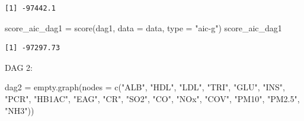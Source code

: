 \documentclass[
  11pt,
  a4paper,
]{article}
\newenvironment{Shaded}{\begin{snugshade}}{\end{snugshade}}
\newcommand{\AttributeTok}[1]{\textcolor[rgb]{0.40,0.45,0.13}{#1}}
\newcommand{\FunctionTok}[1]{\textcolor[rgb]{0.28,0.35,0.67}{#1}}
\newcommand{\NormalTok}[1]{\textcolor[rgb]{0.00,0.23,0.31}{#1}}
\newcommand{\OtherTok}[1]{\textcolor[rgb]{0.00,0.23,0.31}{#1}}
\newcommand{\StringTok}[1]{\textcolor[rgb]{0.13,0.47,0.30}{#1}}
\begin{document}
\begin{verbatim}
[1] -97442.1
\end{verbatim}

\begin{Shaded}
\begin{Highlighting}[numbers=left,,]
\NormalTok{score\_aic\_dag1 }\OtherTok{=} \FunctionTok{score}\NormalTok{(dag1, }\AttributeTok{data =}\NormalTok{ data, }\AttributeTok{type =} \StringTok{"aic{-}g"}\NormalTok{)}
\NormalTok{score\_aic\_dag1}
\end{Highlighting}
\end{Shaded}

\begin{verbatim}
[1] -97297.73
\end{verbatim}

DAG 2:

\begin{Shaded}
\begin{Highlighting}[numbers=left,,]
\NormalTok{dag2 }\OtherTok{=} \FunctionTok{empty.graph}\NormalTok{(}\AttributeTok{nodes =} \FunctionTok{c}\NormalTok{(}\StringTok{"ALB"}\NormalTok{, }\StringTok{"HDL"}\NormalTok{, }\StringTok{"LDL"}\NormalTok{, }\StringTok{"TRI"}\NormalTok{, }\StringTok{"GLU"}\NormalTok{, }\StringTok{"INS"}\NormalTok{, }\StringTok{"PCR"}\NormalTok{, }
                              \StringTok{"HB1AC"}\NormalTok{, }\StringTok{"EAG"}\NormalTok{, }\StringTok{"CR"}\NormalTok{, }
                              \StringTok{"SO2"}\NormalTok{, }\StringTok{"CO"}\NormalTok{, }\StringTok{"NOx"}\NormalTok{, }\StringTok{"COV"}\NormalTok{, }\StringTok{"PM10"}\NormalTok{, }\StringTok{"PM2.5"}\NormalTok{, }\StringTok{"NH3"}\NormalTok{))}
\end{Highlighting}
\end{Shaded}
\end{document}
